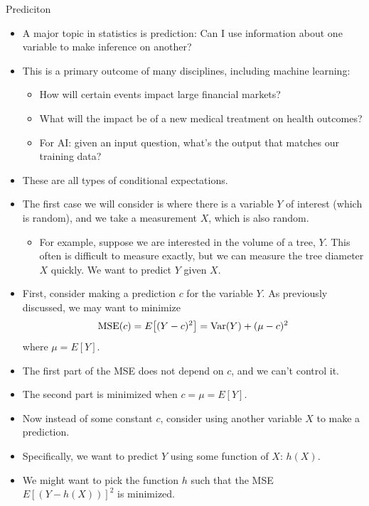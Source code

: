 \begin{frame}[allowframebreaks]{Prediciton}
  \begin{itemize}
    \item A major topic in statistics is prediction: Can I use information about one variable to make inference on another?
    \item This is a primary outcome of many disciplines, including machine learning:
    \begin{itemize}
      \item How will certain events impact large financial markets?
      \item What will the impact be of a new medical treatment on health outcomes?
      \item For AI: given an input question, what's the output that matches our training data? 
    \end{itemize}
    \item These are all types of conditional expectations.
  \end{itemize}
  
  \framebreak
  
  \begin{itemize}
    \item The first case we will consider is where there is a variable $Y$ of interest (which is random), and we take a measurement $X$, which is also random.
    \begin{itemize}
      \item For example, suppose we are interested in the volume of a tree, $Y$. This often is difficult to measure exactly, but we can measure the tree diameter $X$ quickly. We want to predict $Y$ given $X$. 
    \end{itemize}
    \item First, consider making a prediction $c$ for the variable $Y$. As previously discussed, we may want to minimize
    \begin{align*}
      \text{MSE}(c) = E\big[(Y - c)^2\big] = \mathrm{Var}(Y) + (\mu - c)^2
    \end{align*}
    where $\mu = E[Y]$.
    
    \framebreak 
    
    \item The first part of the MSE does not depend on $c$, and we can't control it.
    \item The second part is minimized when $c = \mu = E[Y]$.
    \item Now instead of some constant $c$, consider using another variable $X$ to make a prediction. 
    \item Specifically, we want to predict $Y$ using some function of $X$: $h(X)$.
    \item We might want to pick the function $h$ such that the MSE $E[(Y - h(X))]^2$ is minimized.
    

\end{itemize}
\end{frame}
